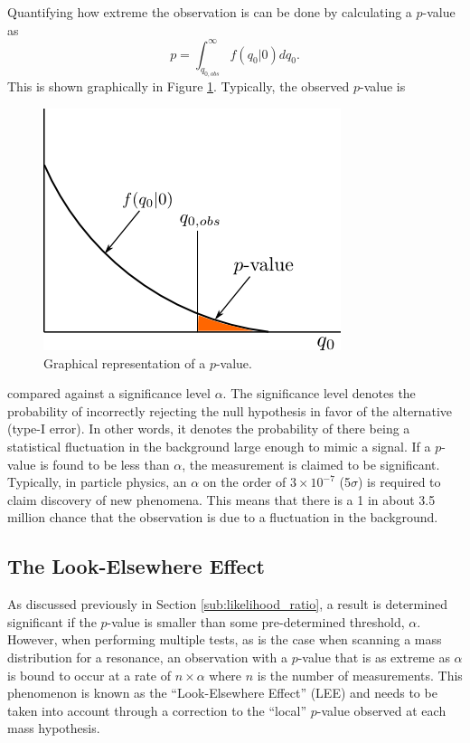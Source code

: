 Quantifying how extreme the observation is can be done by calculating a $p$-value as
\begin{equation}
    p = \int_{q_{0,obs}}^{\infty} f(q_{0} | 0) dq_{0}.
\end{equation} 
This is shown graphically in Figure \ref{fig:p_value}.  Typically, the observed 
$p$-value is
\begin{figure}[t]
    \centering
    \includegraphics[width=.5\textwidth]{images/p_value.png}
    \caption{Graphical representation of a $p$-value.}
    \label{fig:p_value}
\end{figure}
compared against a significance level $\alpha$.  The significance level denotes
the probability of incorrectly rejecting the null hypothesis in favor of the 
alternative (type-I error).  In other words, it denotes the probability of there
being a statistical fluctuation in the background large enough to mimic a signal.  
If a $p$-value is 
found to be less than $\alpha$, the measurement is claimed to be significant. 
Typically, in particle 
physics, an $\alpha$ on the order of $3 \times 10^{-7}$ (5$\sigma$) is required
to claim discovery of new phenomena.  This means that there is a 1 in 
about 3.5 million chance that the observation is due to a fluctuation in the background.

\subsection{The Look-Elsewhere Effect}

As discussed previously in Section \ref{sub:likelihood_ratio}, a result is 
determined significant if the $p$-value is smaller than some pre-determined
threshold, $\alpha$.  However, 
when performing multiple tests, as is the case when scanning a mass distribution
for a resonance, an observation with a $p$-value that is as extreme as $\alpha$
is bound to occur at a rate of $n\times\alpha$ where $n$ is the number of measurements.
This phenomenon is known as the ``Look-Elsewhere Effect'' (LEE)
and needs to be taken into account through a correction to the ``local'' $p$-value
observed at each mass hypothesis.

